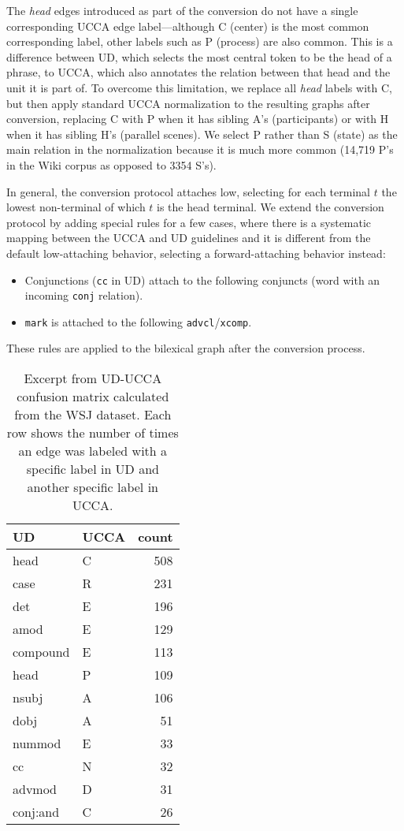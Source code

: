 \documentclass[11pt,a4paper]{article}
\begin{document}
The \textit{head} edges introduced as part of the conversion do not have a single
corresponding UCCA edge label---although C (center) is the most common corresponding label,
other labels such as P (process) are also common.
This is a difference between UD, which selects the most central token to be the head of a phrase,
to UCCA, which also annotates the relation between that head and the unit it is part of.
To overcome this limitation, we replace all \textit{head} labels with C, but then
apply standard UCCA normalization to the resulting graphs after conversion,
replacing C with P when it has sibling A's (participants) or
with H when it has sibling H's (parallel scenes).
We select P rather than S (state) as the main relation in the normalization because
it is much more common (14,719 P's in the Wiki corpus as opposed to 3354 S's).

In general, the conversion protocol attaches low,
selecting for each terminal $t$ the lowest non-terminal of which $t$
is the head terminal.
We extend the conversion protocol by adding special rules for a few cases,
where there is a systematic mapping between the UCCA and UD guidelines
and it is different from the default low-attaching behavior,
selecting a forward-attaching behavior instead:
\begin{itemize}
  \item Conjunctions (\verb|cc| in UD) attach to the following
  conjuncts (word with an incoming \verb|conj| relation).
  \item \verb|mark| is attached to the following \verb|advcl|/\verb|xcomp|.
\end{itemize}
These rules are applied to the bilexical graph after the conversion process.

\begin{table}[t]
\centering
\begin{tabular}{ll|r}
UD & UCCA & count \\
\hline
head & C & 508 \\
case & R & 231 \\
det & E & 196 \\ 
amod & E & 129 \\
compound & E & 113 \\
head & P & 109 \\
nsubj & A & 106 \\
dobj & A & 51 \\
nummod & E & 33 \\
cc & N & 32 \\
advmod & D & 31 \\
conj:and & C & 26
\end{tabular}
\caption{Excerpt from UD-UCCA confusion matrix calculated from the WSJ dataset.
Each row shows the number of times an edge was labeled with a specific label in UD
and another specific label in UCCA.\label{tab:confusion_matrix}}
\end{table}
\end{document}
